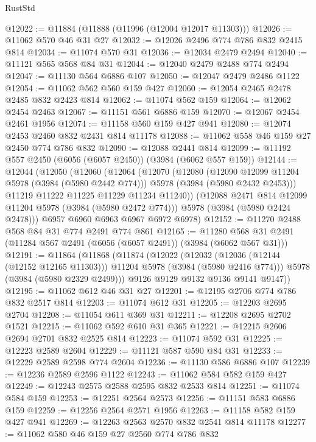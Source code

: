 \begin{lexlean}{RustStd}
\begin{coremodule}
@12022 := @11884 (@11888 (@11996 (@12004 @12017 @11303)))
@12026 := @11062 @570 @46 @31 @27
@12032 := @12026 @2496 @774 @786 @832 @2415 @814
@12034 := @11074 @570 @31
@12036 := @12034 @2479 @2494
@12040 := @11121 @565 @568 @84 @31
@12044 := @12040 @2479 @2488 @774 @2494
@12047 := @11130 @564 @6886 @107
@12050 := @12047 @2479 @2486 @1122
@12054 := @11062 @562 @560 @159 @427
@12060 := @12054 @2465 @2478 @2485 @832 @2423 @814
@12062 := @11074 @562 @159
@12064 := @12062 @2454 @2463
@12067 := @11151 @561 @6886 @159
@12070 := @12067 @2454 @2461 @1956
@12074 := @11158 @560 @159 @427 @941
@12080 := @12074 @2453 @2460 @832 @2431 @814 @11178
@12088 := @11062 @558 @46 @159 @27 @2450 @774 @786 @832
@12090 := @12088 @2441 @814
@12099 := @11192 @557 @2450 (@6056 (@6057 @2450)) (@3984 (@6062 @557 @159))
@12144 := @12044
    (@12050
      (@12060
        (@12064
          (@12070
            (@12080
              (@12090 @12099 @11204 @5978 (@3984 (@5980 @2442 @774)))
              @5978
              (@3984 (@5980 @2432 @2453)))
            @11219
            @11222
            @11225
            @11229
            @11234
            @11240))
        (@12088 @2471 @814 @12099 @11204 @5978 (@3984 (@5980 @2472 @774)))
        @5978
        (@3984 (@5980 @2424 @2478)))
      @6957
      @6960
      @6963
      @6967
      @6972
      @6978)
@12152 := @11270 @2488 @568 @84 @31 @774 @2491 @774 @861
@12165 := @11280 @568 @31 @2491 (@11284 @567 @2491 (@6056 (@6057 @2491)) (@3984 (@6062 @567 @31)))
@12191 := @11864
    (@11868
      (@11874
        (@12022
          (@12032 (@12036 (@12144 (@12152 @12165 @11303))) @11204 @5978 (@3984 (@5980 @2416 @774)))
          @5978
          (@3984 (@5980 @2329 @2499)))
        @9126
        @9129
        @9132
        @9136
        @9141
        @9147))
@12195 := @11062 @612 @46 @31 @27
@12201 := @12195 @2706 @774 @786 @832 @2517 @814
@12203 := @11074 @612 @31
@12205 := @12203 @2695 @2704
@12208 := @11054 @611 @369 @31
@12211 := @12208 @2695 @2702 @1521
@12215 := @11062 @592 @610 @31 @365
@12221 := @12215 @2606 @2694 @2701 @832 @2525 @814
@12223 := @11074 @592 @31
@12225 := @12223 @2589 @2604
@12229 := @11121 @587 @590 @84 @31
@12233 := @12229 @2589 @2598 @774 @2604
@12236 := @11130 @586 @6886 @107
@12239 := @12236 @2589 @2596 @1122
@12243 := @11062 @584 @582 @159 @427
@12249 := @12243 @2575 @2588 @2595 @832 @2533 @814
@12251 := @11074 @584 @159
@12253 := @12251 @2564 @2573
@12256 := @11151 @583 @6886 @159
@12259 := @12256 @2564 @2571 @1956
@12263 := @11158 @582 @159 @427 @941
@12269 := @12263 @2563 @2570 @832 @2541 @814 @11178
@12277 := @11062 @580 @46 @159 @27 @2560 @774 @786 @832

\end{coremodule}
\end{lexlean}
